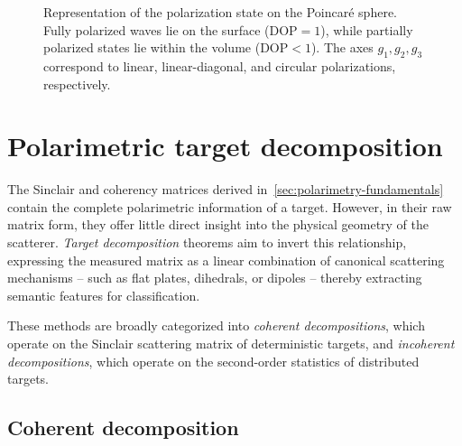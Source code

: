 \begin{figure}[t]
    \caption{
        Representation of the polarization state on the Poincar\'e sphere.
        Fully polarized waves lie on the surface ($\text{DOP} = 1$), while partially polarized states lie within the volume ($\text{DOP} < 1$).
        The axes $g_1, g_2, g_3$ correspond to linear, linear-diagonal, and circular polarizations, respectively.
    }
    \label{fig:poincare-sphere}
\end{figure}


\section{Polarimetric target decomposition}
\label{sec:target-decomposition}

The Sinclair and coherency matrices derived in~\cref{sec:polarimetry-fundamentals} contain the complete polarimetric information of a target.
However, in their raw matrix form, they offer little direct insight into the physical geometry of the scatterer.
\emph{Target decomposition} theorems aim to invert this relationship, expressing the measured matrix as a linear combination of canonical scattering mechanisms -- such as flat plates, dihedrals, or dipoles -- thereby extracting semantic features for classification.

These methods are broadly categorized into \emph{coherent decompositions}, which operate on the Sinclair scattering matrix of deterministic targets, and \emph{incoherent decompositions}, which operate on the second-order statistics of distributed targets.


\subsection{Coherent decomposition}
\label{subsec:coherent-decomposition}

